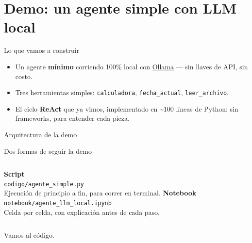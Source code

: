 \section{Demo: un agente simple con LLM local}

\begin{frame}{Lo que vamos a construir}
  \begin{itemize}
    \item Un agente \textbf{mínimo} corriendo 100\% local con
      \href{https://ollama.com}{Ollama} — sin llaves de API, sin costo.
    \item Tres herramientas simples: \texttt{calculadora}, \texttt{fecha\_actual},
      \texttt{leer\_archivo}.
    \item El ciclo \textbf{ReAct} que ya vimos, implementado en \textasciitilde100
      líneas de Python: sin frameworks, para entender cada pieza.
  \end{itemize}
\end{frame}

\begin{frame}{Arquitectura de la demo}
  \centering
\end{frame}

\begin{frame}{Dos formas de seguir la demo}
  \begin{columns}
    \centering
    \textbf{Script}\\[0.3em]
    \texttt{codigo/agente\_simple.py}\\[0.5em]
    \footnotesize Ejecución de principio a fin, para correr en terminal.
    \centering
    \textbf{Notebook}\\[0.3em]
    \texttt{notebook/agente\_llm\_local.ipynb}\\[0.5em]
    \footnotesize Celda por celda, con explicación antes de cada paso.
  \end{columns}
  \vfill
  \centering
  \Large Vamos al código.
\end{frame}
